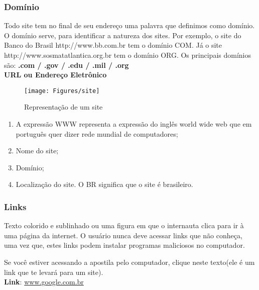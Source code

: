 \documentclass[hidelinks,12pt]{article}
\begin{document}
			\subsubsection{Domínio}

			Todo site tem no final de seu endereço uma palavra que definimos como domínio. O domínio serve, para identificar a natureza dos sites. Por exemplo, o site do Banco do Brasil http://www.bb.com.br tem o domínio COM. Já o site http://www.sosmatatlantica.org.br tem o domínio ORG. Os principais domínios são: \textbf{.com / .gov / .edu / .mil / .org}\\

			 \textbf{URL ou Endereço Eletrônico}

			\begin{figure}[!h]
				\centering
				\texttt{[image: Figures/site]}
				\label{fig:site}
				\caption{Representação de um site}
			\end{figure}

			\begin{enumerate}
				\item A expressão WWW representa a expressão do inglês world wide web que em português quer dizer rede mundial de computadores;

				\item Nome do site;

				\item Domínio;

				\item Localização do site. O BR significa que o site é brasileiro.

			\end{enumerate}

		\subsubsection{Links}
			Texto colorido e sublinhado ou uma figura em que o internauta clica para ir à uma página da internet. O usuário nunca deve acessar links que não conheça, uma vez que, estes links podem instalar programas maliciosos no computador.

			Se você estiver acessando a apostila pelo computador, clique neste texto(ele é um link que te levará para um site).\\
			\textbf{Link}: \url{www.google.com.br}
\end{document}
